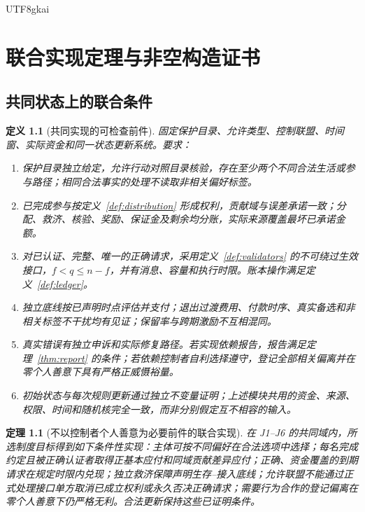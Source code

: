 \documentclass[12pt,a4paper,openany]{report}
\newtheorem{definition}{定义}[chapter]
\newtheorem{theorem}{定理}[chapter]
\begin{document}
\begin{CJK*}{UTF8}{gkai}
\chapter{联合实现定理与非空构造证书}
\label{chap:joint}
\section{共同状态上的联合条件}
\begin{definition}[共同实现的可检查前件]
\label{def:joint}
固定保护目录、允许类型、控制联盟、时间窗、实际资金和同一状态更新系统。要求：
\begin{enumerate}[label=\textnormal{J\arabic*:},leftmargin=3.5em]
\item 保护目录独立给定，允许行动对照目录核验，存在至少两个不同合法生活或参与路径；相同合法事实的处理不读取非相关偏好标签。
\item 已完成参与按定义~\ref{def:distribution} 形成权利，贡献域与误差承诺一致；分配、救济、核验、奖励、保证金及剩余均分账，实际来源覆盖最坏已承诺金额。
\item 对已认证、完整、唯一的正确请求，采用定义~\ref{def:validators} 的不可绕过生效接口，$f<q\le n-f$，并有消息、容量和执行时限。账本操作满足定义~\ref{def:ledger}。
\item 独立底线按已声明时点评估并支付；退出过渡费用、付款时序、真实备选和非相关标签不干扰均有见证；保留率与跨期激励不互相混同。
\item 真实错误有独立申诉和实际修复路径。若实现依赖报告，报告满足定理~\ref{thm:report} 的条件；若依赖控制者自利选择遵守，登记全部相关偏离并在零个人善意下具有严格正威慑裕量。
\item 初始状态与每次规则更新通过独立不变量证明；上述模块共用的资金、来源、权限、时间和随机核完全一致，而非分别假定互不相容的输入。
\end{enumerate}
\end{definition}

\begin{theorem}[不以控制者个人善意为必要前件的联合实现]
\label{thm:main}
在 J1--J6 的共同域内，所选制度目标得到如下条件性实现：主体可按不同偏好在合法选项中选择；每名完成约定且被正确认证者取得正基本应付和同域贡献差异应付；正确、资金覆盖的到期请求在规定时限内兑现；独立救济保障声明生存--接入底线；允许联盟不能通过正式处理接口单方取消已成立权利或永久否决正确请求；需要行为合作的登记偏离在零个人善意下仍严格无利。合法更新保持这些已证明条件。


\end{theorem}
\end{CJK*}
\end{document}
